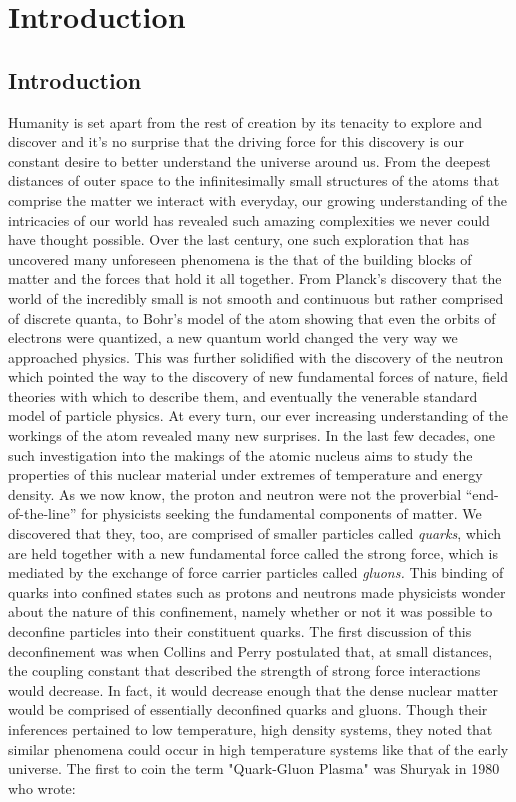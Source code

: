 \chapter{Introduction}


\section{Introduction}
Humanity is set apart from the rest of creation by its tenacity to explore and discover and it's no surprise that the driving force for this discovery is our constant desire to better understand the universe around us. From the deepest distances of outer space to the infinitesimally small structures of the atoms that comprise the matter we interact with everyday, our growing understanding of the intricacies of our world has revealed such amazing complexities we never could have thought possible. Over the last century, one such exploration that has uncovered many unforeseen phenomena is the that of the building blocks of matter and the forces that hold it all together. From Planck's discovery that the world of the incredibly small is not smooth and continuous but rather comprised of discrete quanta, to Bohr's model of the atom showing that even the orbits of electrons were quantized, a new quantum world changed the very way we approached physics. This was further solidified with the discovery of the neutron which pointed the way to the discovery of new fundamental forces of nature, field theories with which to describe them, and eventually the venerable standard model of particle physics. At every turn, our ever increasing understanding of the workings of the atom revealed many new surprises. In the last few decades, one such investigation into the makings of the atomic nucleus aims to study the properties of this nuclear material under extremes of temperature and energy density. As we now know, the proton and neutron were not the proverbial 
``end-of-the-line'' for physicists seeking the fundamental components of matter. We discovered that they, too, are comprised of smaller particles called \textit{quarks}, which are held together with a new fundamental force called the strong force, which is mediated by the exchange of force carrier particles called \textit{gluons.} This binding of quarks into confined states such as protons and neutrons made physicists wonder about the nature of this confinement, namely whether or not it was possible to deconfine particles into their constituent quarks. The first discussion of this deconfinement was when Collins and Perry \citep{Collins:1974ky} postulated that, at small distances, the coupling constant that described the strength of strong force interactions would decrease. In fact, it would decrease enough that the dense nuclear matter would be comprised of essentially deconfined quarks and gluons. Though their inferences pertained to low temperature, high density systems, they noted that similar phenomena could occur in high temperature systems like that of the early universe. The first to coin the term "Quark-Gluon Plasma" was Shuryak in 1980 \citep{Shuryak:1980tp} who wrote: 

